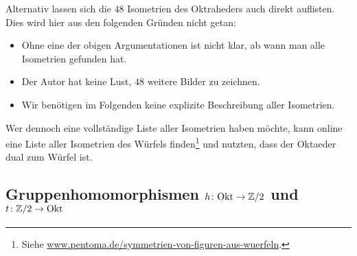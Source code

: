 Alternativ lassen sich die $48$ Isometrien des Oktraheders auch direkt auflisten.
Dies wird hier aus den folgenden Gründen nicht getan:
\begin{itemize}
  \item
    Ohne eine der obigen Argumentationen ist nicht klar, ab wann man alle Isometrien gefunden hat.
  \item
    Der Autor hat keine Lust, $48$ weitere Bilder zu zeichnen.
  \item
    Wir benötigen im Folgenden keine explizite Beschreibung aller Isometrien.
\end{itemize}
Wer dennoch eine vollständige Liste aller Isometrien haben möchte, kann online eine Liste aller Isometrien des Würfels finden\footnote{Siehe \url{www.pentoma.de/symmetrien-von-figuren-aus-wuerfeln}.} und nutzten, dass der Oktaeder dual zum Würfel ist.





\subsection*{Gruppenhomomorphismen $h \colon \mathrm{Okt} \to \mathbb{Z}/2$ und $t \colon \mathbb{Z}/2 \to \mathrm{Okt}$}

